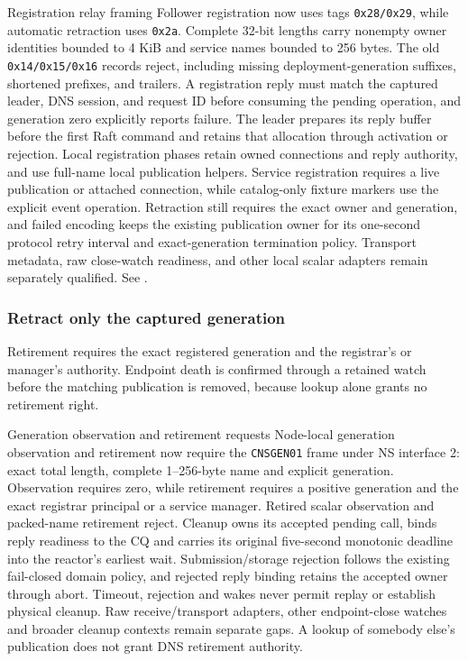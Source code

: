\begin{implementationdetail}{Registration relay framing}
Follower registration now uses tags \texttt{0x28/0x29}, while automatic retraction
uses \texttt{0x2a}. Complete 32-bit lengths carry nonempty owner identities
bounded to 4 KiB and service names bounded to 256 bytes. The old
\texttt{0x14/0x15/0x16} records reject, including missing deployment-generation
suffixes, shortened prefixes, and trailers. A registration reply must match the
captured leader, DNS session, and request ID before consuming the pending
operation, and generation zero explicitly reports failure. The leader prepares
its reply buffer before the first Raft command and retains that allocation
through activation or rejection. Local registration phases retain owned
connections and reply authority, and use full-name local publication helpers.
Service registration requires a live publication or attached connection, while
catalog-only fixture markers use the explicit event operation.
Retraction still requires the exact owner and generation, and failed encoding keeps
the existing publication owner for its one-second protocol retry interval
and exact-generation termination policy. Transport
metadata, raw close-watch readiness, and other local scalar adapters remain
separately qualified. See .
\end{implementationdetail}

\subsubsection{Retract only the captured generation}

Retirement requires the exact registered generation and the registrar's or
manager's authority. Endpoint death is confirmed through a retained watch before
the matching publication is removed, because lookup alone grants no retirement right.

\begin{implementationdetail}{Generation observation and retirement requests}
Node-local generation observation and retirement now require the
\texttt{CNSGEN01} frame under NS interface 2: exact total length, complete
1--256-byte name and explicit generation. Observation requires zero, while retirement
requires a positive generation and the exact registrar principal or a service
manager. Retired scalar observation and packed-name retirement reject. Cleanup
owns its accepted pending call, binds reply readiness to the CQ and carries its
original five-second monotonic deadline into the reactor's earliest wait.
Submission/storage rejection follows the existing fail-closed domain policy, and
rejected reply binding retains the accepted owner through abort. Timeout,
rejection and wakes never permit replay or establish physical cleanup. Raw
receive/transport adapters, other endpoint-close watches and broader cleanup
contexts remain separate gaps. A lookup of somebody else's publication does
not grant DNS retirement authority.
\end{implementationdetail}

